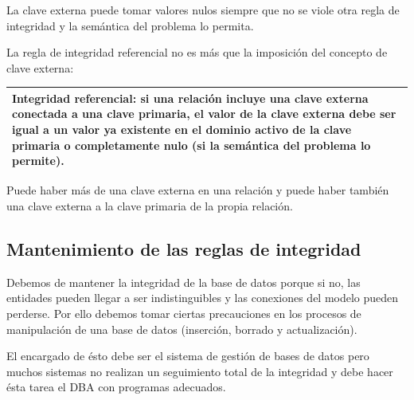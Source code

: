 \documentclass[10pt,a4paper,spanish]{report}
\begin{document}
La clave externa puede tomar valores nulos siempre que no se viole otra regla de integridad y la semántica del problema lo permita.

La regla de integridad referencial no es más que la imposición del concepto de clave externa:

\begin{center}
\begin{tabular}{|p{12cm}|}
\hline
\textcolor[rgb]{1,0.2,0.3}{\textbf{Integridad referencial}}: si una relación incluye una clave externa conectada a una clave primaria, el valor de la clave externa debe ser igual a un valor ya existente en el dominio activo de la clave primaria o completamente nulo (si la semántica del problema lo permite).\\
\hline
\end{tabular} 
\end{center}

Puede haber más de una clave externa en una relación y puede haber también una clave externa a la clave primaria de la propia relación.

\textcolor[rgb]{1,0.2,0.3}{\subsection{Mantenimiento de las reglas de integridad}}
Debemos de mantener la integridad de la base de datos porque si no, las entidades pueden llegar a ser indistinguibles y las conexiones del modelo pueden perderse. Por ello debemos tomar ciertas precauciones en los procesos de manipulación de una base de datos (inserción, borrado y actualización).

El encargado de ésto debe ser el sistema de gestión de bases de datos pero muchos sistemas no realizan un seguimiento total de la integridad y debe hacer ésta tarea el DBA con programas adecuados.
\end{document}

